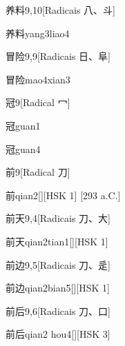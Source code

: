 \begin{entry}{养料}{9,10}[Radicais ⼋、⽃]
  \begin{phonetics}{养料}{yang3liao4}
  \end{phonetics}
\end{entry}

\begin{entry}{冒险}{9,9}[Radicais ⽇、⾩]
  \begin{phonetics}{冒险}{mao4xian3}
  \end{phonetics}
\end{entry}

\begin{entry}{冠}{9}[Radical ⼍]
  \begin{phonetics}{冠}{guan1}
  \end{phonetics}
  \begin{phonetics}{冠}{guan4}
  \end{phonetics}
\end{entry}

\begin{entry}{前}{9}[Radical ⼑]
  \begin{phonetics}{前}{qian2}[][HSK 1]
    [293 a.C.]
  \end{phonetics}
\end{entry}

\begin{entry}{前天}{9,4}[Radicais ⼑、⼤]
  \begin{phonetics}{前天}{qian2tian1}[][HSK 1]
  \end{phonetics}
\end{entry}

\begin{entry}{前边}{9,5}[Radicais ⼑、⾡]
  \begin{phonetics}{前边}{qian2bian5}[][HSK 1]
  \end{phonetics}
\end{entry}

\begin{entry}{前后}{9,6}[Radicais ⼑、⼝]
  \begin{phonetics}{前后}{qian2 hou4}[][HSK 3]
  \end{phonetics}
\end{entry}

